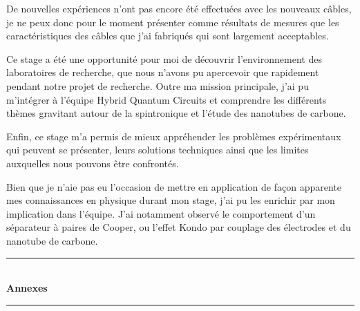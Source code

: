 \documentclass[a4paper,12pt]{report}
\begin{document}
De nouvelles expériences n'ont pas encore été effectuées avec les nouveaux câbles, je ne peux donc pour le moment présenter comme résultats de mesures que les caractéristiques des câbles que j'ai fabriqués qui sont largement acceptables.\newline

Ce stage a été une opportunité pour moi de découvrir l'environnement des laboratoires de recherche, que nous n'avons pu apercevoir que rapidement pendant notre projet de recherche. Outre ma mission principale, j'ai pu m'intégrer à l'équipe Hybrid Quantum Circuits et comprendre les différents thèmes gravitant autour de la spintronique et l'étude des nanotubes de carbone.\newline

Enfin, ce stage m'a permis de mieux appréhender les problèmes expérimentaux qui peuvent se présenter, leurs solutions techniques ainsi que les limites auxquelles nous pouvons être confrontés.\newline

Bien que je n'aie pas eu l'occasion de mettre  en application de façon apparente mes connaissances en physique durant mon stage, j'ai pu les enrichir par mon implication dans l'équipe. J'ai notamment observé le comportement d'un séparateur à paires de Cooper, ou l'effet Kondo par couplage des électrodes et du nanotube de carbone.




\newpage
\appendix
{}
{}

\vspace*{8cm}
\begin{center}
\rule{\linewidth}{0.5mm}\\[0.7cm]
{\huge{\bfseries Annexes}}\\[0.4cm]
\rule{\linewidth}{0.5mm}\\[0.5cm]


\end{center}
\newpage
{}
{}

\end{document}
